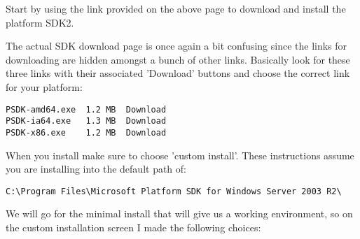 
Start by using the link provided on the above page to download and install the
platform SDK2.

The actual SDK download page is once again a bit confusing since the links for 
downloading are hidden amongst a bunch of other links. Basically look for these 
three links with their associated 'Download' buttons and choose the correct 
link for your platform:

\begin{verbatim}
PSDK-amd64.exe  1.2 MB  Download 
PSDK-ia64.exe   1.3 MB  Download 
PSDK-x86.exe    1.2 MB  Download
\end{verbatim}

When you install make sure to choose 'custom install'. These instructions 
assume you are installing into the default path of:

\begin{verbatim}
C:\Program Files\Microsoft Platform SDK for Windows Server 2003 R2\
\end{verbatim}

We will go for the minimal install that will give us a working environment, 
so on the custom installation screen I made the following choices:

